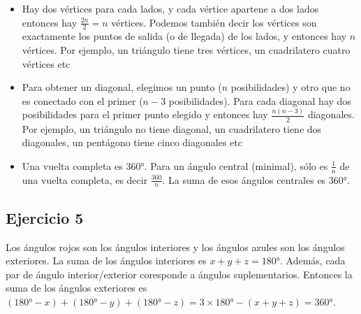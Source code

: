 \begin{itemize}
\item Hay dos vértices para cada lados, y cada vértice apartene a dos lados
  entonces hay $\frac{2n}{2} = n$ vértices. Podemos también decir los
  vértices son exactamente los puntos de salida (o de llegada) de los
  lados, y entonces hay $n$ vértices. Por ejemplo, un triángulo tiene tres
  vértices, un cuadrilatero cuatro vértices etc
\item Para obtener un diagonal, elegimos un punto ($n$ posibilidades) y
  otro que no es conectado con el primer ($n-3$ posibilidades). Para cada
  diagonal hay dos posibilidades para el primer punto elegido y entonces
  hay $\frac{n{(n-3)}}{2}$ diagonales. Por ejemplo, un triángulo no tiene 
  diagonal, un cuadrilatero tiene dos diagonales, un pentágono tiene
  cinco diagonales etc
\item Una vuelta completa es 360°. Para un ángulo central (minimal), sólo
  es $\frac{1}{n}$ de una vuelta completa, es decir $\frac{360}{n}$. La suma
  de esos ángulos centrales es 360°.
\end{itemize}

\subsection{Ejercicio 5}

Los ángulos rojos son los ángulos interiores y
los ángulos azules son los ángulos exteriores. La suma de los ángulos interiores
es $x+y+z=180°$.
Además, cada par de ángulo interior/exterior coresponde a
ángulos suplementarios. Entonces la suma de los ángulos exteriores es
${(180° - x)} + {(180° - y)} + {(180° - z)} = 3\times180° - {(x+y+z)} = 360°$.

\begin{center}
\end{center}

